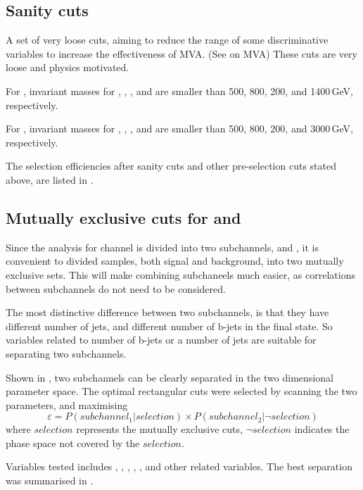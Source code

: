 

\subsection{Sanity cuts}

A set of very loose cuts, aiming to reduce the range of some discriminative variables to increase the effectiveness of MVA. (See \Section{} on MVA) These cuts are very loose and physics motivated.

For , invariant masses for \Hbb, \HWW, \PW, and \HH are smaller than 500, 800, 200, and 1400\,GeV, respectively.

For , invariant masses for \Hbb, \HWW, \PW, and \HH are smaller than 500, 800, 200, and 3000\,GeV, respectively.

The selection efficiencies after sanity cuts and other pre-selection cuts stated above, are listed in \Table{}.

\subsection{Mutually exclusive cuts for \eeToHHbbWW and \eeToHHbbbb}

Since the analysis for \eeToHH channel is divided into two subchannels, \eeToHHbbWWHad and \eeToHHbbbb, it is convenient to divided samples, both signal and background, into two mutually exclusive sets. This will make combining subchaneels much easier, as correlations between subchannels do not need to be considered.

The most distinctive difference between two subchannels, is that they have different number of jets, and different number of b-jets in the final state. So variables related to number of b-jets or a number of jets are suitable for separating two subchannels.

Shown in , two subchannels can be clearly separated in the two dimensional parameter space. The optimal rectangular cuts were selected by scanning the two parameters, and maximising
\begin{equation}
\varepsilon = P(subchannel_1|selection) \times P(subchannel_2|\neg{selection})
\end{equation}
where $selection$ represents the mutually exclusive cuts, $\neg{selection}$ indicates the phase space not covered by the $selection$.

Variables tested includes , , , , ,  and other related variables. The best separation was summarised in .

